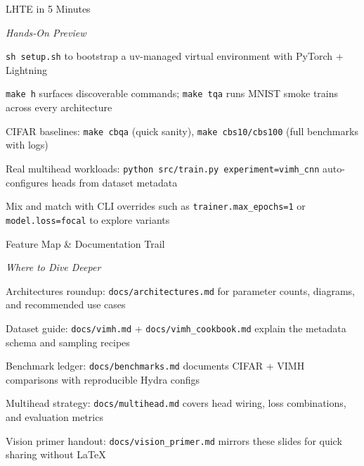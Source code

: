 \begin{slide}[\slideopts,toc={LHTE Tour}]{LHTE in 5 Minutes}

  \emph{Hands-On Preview}

  \begin{itemize}
    \mpitem \texttt{sh setup.sh} to bootstrap a uv-managed virtual environment with PyTorch + Lightning

    \mpitem \texttt{make h} surfaces discoverable commands; \texttt{make tqa} runs MNIST smoke trains across every architecture

    \mpitem CIFAR baselines: \texttt{make cbqa} (quick sanity), \texttt{make cbs10/cbs100} (full benchmarks with logs)

    \mpitem Real multihead workloads: \texttt{python src/train.py experiment=vimh\_cnn} auto-configures heads from dataset metadata

    \mpitem Mix and match with CLI overrides such as \texttt{trainer.max\_epochs=1} or \texttt{model.loss=focal} to explore variants
  \end{itemize}

\end{slide}

\begin{slide}[\slideopts,toc={Feature Map}]{Feature Map \& Documentation Trail}

  \emph{Where to Dive Deeper}

  \begin{itemize}
    \mpitem Architectures roundup: \texttt{docs/architectures.md} for parameter counts, diagrams, and recommended use cases

    \mpitem Dataset guide: \texttt{docs/vimh.md} + \texttt{docs/vimh\_cookbook.md} explain the metadata schema and sampling recipes

    \mpitem Benchmark ledger: \texttt{docs/benchmarks.md} documents CIFAR + VIMH comparisons with reproducible Hydra configs

    \mpitem Multihead strategy: \texttt{docs/multihead.md} covers head wiring, loss combinations, and evaluation metrics

    \mpitem Vision primer handout: \texttt{docs/vision\_primer.md} mirrors these slides for quick sharing without LaTeX
  \end{itemize}

\end{slide}

